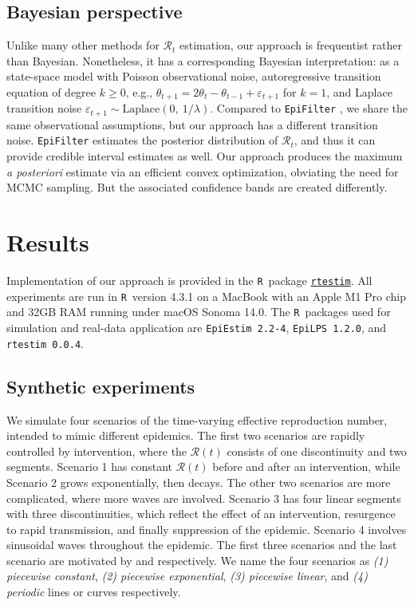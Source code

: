 \documentclass[10pt,letterpaper]{article}
\newcommand{\R}{\texttt{R}}
\def\calR{\mathcal{R}}
\newcommand{\citep}[1]{\cite{#1}}
\begin{document}
\subsection{Bayesian perspective}

Unlike many other methods for $\calR_t$ estimation, our approach is frequentist
rather than Bayesian. Nonetheless, it has a corresponding Bayesian
interpretation: as a state-space model with Poisson observational noise,
autoregressive transition equation of degree $k\geq 0$, e.g., $\theta_{t+1} =
2\theta_t - \theta_{t-1} + \varepsilon_{t+1}$ for $k=1$, and Laplace transition
noise $\varepsilon_{t+1}\sim \mathrm{Laplace}(0,\ 1/\lambda)$. Compared to
\texttt{EpiFilter} \citep{parag2021improved},
 we share the same observational assumptions, but our approach has a
different transition noise. \texttt{EpiFilter} estimates the posterior
distribution of
$\calR_t$, and thus it can provide credible interval estimates as well. Our
approach produces the maximum \emph{a posteriori} estimate via an efficient
convex optimization, obviating the need for MCMC sampling. But the associated
confidence bands are created differently.


\section{Results}

Implementation of our approach is provided in the \R\ package
\href{https://dajmcdon.github.io/rtestim/}{\texttt{rtestim}}. All experiments
are run in \R\ version 4.3.1 on a MacBook with an Apple M1 Pro chip
and 32GB RAM running under macOS Sonoma 14.0. The \R\ packages used for
simulation and real-data application are \texttt{EpiEstim 2.2-4},
\texttt{EpiLPS 1.2.0}, and \texttt{rtestim 0.0.4}. 

\subsection{Synthetic experiments}

We simulate four scenarios of the time-varying effective reproduction number,
intended to mimic different epidemics. The first two scenarios are rapidly controlled by intervention, where the $\calR(t)$ consists
of one discontinuity and two segments. Scenario 1 has constant $\calR(t)$ before
and after an intervention, while Scenario 2 grows exponentially, then decays.
The other two scenarios are more complicated, where more waves
are involved. Scenario 3 has four linear segments with three discontinuities,
which reflect the effect of an intervention, resurgence to rapid transmission,
and finally suppression of the epidemic. Scenario 4 involves sinusoidal waves
throughout the epidemic.
The first three scenarios and the last scenario are motivated by
\cite{parag2021improved} and \cite{gressani2022epilps} respectively. 
We name the four scenarios as \textit{(1) piecewise constant}, \textit{(2) 
piecewise exponential}, \textit{(3) piecewise linear}, and \textit{(4) periodic} 
lines or curves respectively. 
\end{document}
